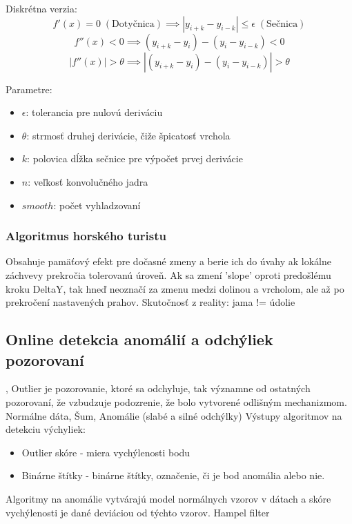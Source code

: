 Diskrétna verzia:
$$f'(x) = 0 \; \mathrm{(Dotyčnica)} \implies |y_{i+k} - y_{i-k}| \leq \epsilon \;\mathrm{(Sečnica)}$$
$$f''(x) < 0 \implies (y_{i+k} - y_i) - (y_i - y_{i-k}) < 0$$
$$|f''(x)| > \theta \implies |(y_{i+k} - y_i) - (y_i - y_{i-k})| > \theta$$

Parametre:
\begin{itemize}
\item $\epsilon$: tolerancia pre nulovú deriváciu
\item $\theta$: strmosť druhej derivácie, čiže špicatosť vrchola
\item $k$: polovica dĺžka sečnice pre výpočet prvej derivácie
\item $n$: veľkosť konvolučného jadra
\item $smooth$: počet vyhladzovaní
\end{itemize}

\subsubsection{Algoritmus horského turistu}
Obsahuje pamäťový efekt pre dočasné zmeny a berie ich do úvahy ak lokálne záchvevy prekročia tolerovanú úroveň. Ak sa zmení 'slope' oproti predošlému kroku DeltaY, tak hneď neoznačí za zmenu medzi dolinou a vrcholom, ale až po prekročení nastavených prahov. Skutočnosť z reality: jama != údolie \cite{peek-mountaineer-method}


\subsection{Online detekcia anomálií a odchýliek pozorovaní}
\cite{generalized-esd}
\cite{twitter-esd},
Outlier je pozorovanie, ktoré sa odchyluje, tak významne od ostatných pozorovaní, že vzbudzuje
podozrenie, že bolo vytvorené odlišným mechanizmom. Normálne dáta, Šum, Anomálie (slabé a silné odchýlky)
Výstupy algoritmov na detekciu výchyliek:
\begin{itemize}
\itemsep0pt
\item Outlier skóre - miera vychýlenosti bodu
\item Binárne štítky - binárne štítky, označenie, či je bod anomália alebo nie.
\end{itemize}
Algoritmy na anomálie vytvárajú model normálnych vzorov v dátach a skóre vychýlenosti je dané deviáciou od týchto vzorov.
\cite{outlier-analysis}
Hampel filter

